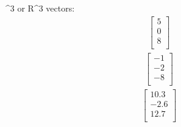 ^{3} \; or \; R^{3} \; vectors:
\begin{align}
    \begin{bmatrix}
        5 \\
        0 \\
        8 \\
    \end{bmatrix}
\end{align}
\begin{align}
    \begin{bmatrix}
        -1 \\
        -2 \\
        -8 \\
    \end{bmatrix}
\end{align}
\begin{align}
    \begin{bmatrix}
        10.3 \\
        -2.6 \\
        12.7 \\
    \end{bmatrix}
\end{align}